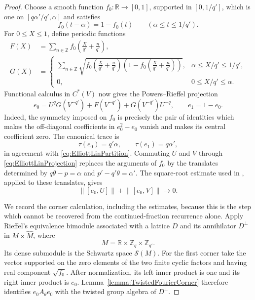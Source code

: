 \documentclass{book}
\begin{document}
\begin{proof}
  Choose a smooth function \(f_0\colon\mathbb R\to[0,1]\), supported in
  \([0,1/q']\), which is one on
  \([q\alpha'/q',\alpha]\) and satisfies
  \[
    f_0(t-\alpha)=1-f_0(t)
    \qquad(\alpha\leq t\leq1/q').
  \]
  For \(0\leq X\leq1\), define periodic functions
  \begin{align*}
    F(X)&=\sum_{n\in\mathbb Z}
      f_0\left(\frac X{q'}+\frac n{q'}\right),\\
    G(X)&=
    \begin{cases}
      \displaystyle\sum_{n\in\mathbb Z}
      \sqrt{
        f_0\left(\frac X{q'}+\frac n{q'}\right)
        \left(1-f_0\left(\frac X{q'}+\frac n{q'}\right)\right)},
        &\alpha\leq X/q'\leq1/q',\\[6pt]
      0,&0\leq X/q'\leq\alpha.
    \end{cases}
  \end{align*}
  Functional calculus in \(C^*(V)\) now gives the Powers--Rieffel
  projection
  \begin{equation}\label{eq:ElliottLinProjection}
    e_0=U^qG(V^{-q'})+F(V^{-q'})+G(V^{-q'})U^{-q},
    \qquad e_1=1-e_0.
  \end{equation}
  Indeed, the symmetry imposed on \(f_0\) is precisely the pair of
  identities which makes the off-diagonal coefficients in \(e_0^2-e_0\)
  vanish and makes its central coefficient zero. The canonical trace is
  \[
    \tau(e_0)=q'\alpha,
    \qquad
    \tau(e_1)=q\alpha',
  \]
  in agreement with \eqref{eq:ElliottLinPartition}. Commuting \(U\) and
  \(V\) through \eqref{eq:ElliottLinProjection} replaces the arguments of
  \(f_0\) by the translates determined by
  \(q\theta-p=\alpha\) and \(p'-q'\theta=\alpha'\). The square-root
  estimate used in \cite[Lemma~2]{ElliottLin1996}, applied to these
  translates, gives
  \[
    \lVert[e_0,U]\rVert+\lVert[e_0,V]\rVert\longrightarrow0.
  \]

  We record the corner calculation, including the estimates, because this
  is the step which cannot be recovered from the continued-fraction
  recurrence alone. Apply Rieffel's equivalence bimodule associated with a
  lattice \(D\) and its annihilator \(D^\perp\) in
  \(M\times\widehat M\), where
  \[
    M=\mathbb R\times\mathbb Z_q\times\mathbb Z_{q'}.
  \]
  Its dense submodule is the Schwartz space \(\mathcal S(M)\). For the
  first corner take the vector supported on the zero elements of the two
  finite cyclic factors and having real component \(\sqrt{f_0}\). After
  normalization, its left inner product is one and its right inner product
  is \(e_0\). Lemma~\ref{lemma:TwistedFourierCorner} therefore identifies
  \(e_0A_\theta e_0\) with the twisted group algebra of \(D^\perp\).


\end{proof}
\end{document}
